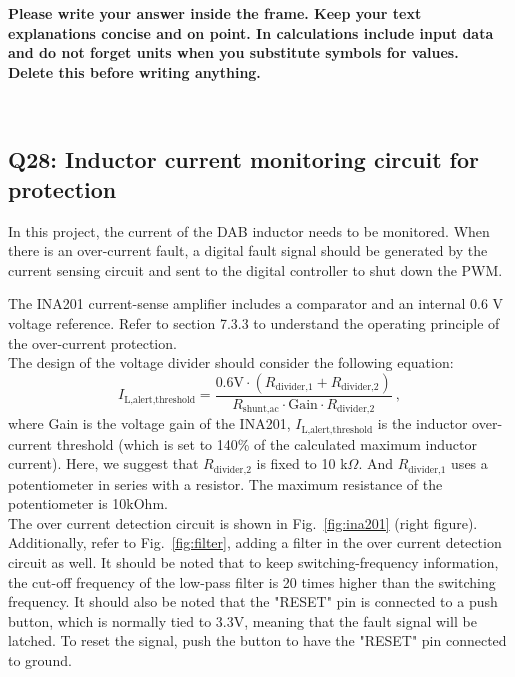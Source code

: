 \documentclass{PELsmallreport}
\begin{document}
\begin{framed}
	\vspace{2em}
	\textbf{Please write your answer inside the frame. Keep your text explanations concise and on point. In calculations include input data and do not forget units when you substitute symbols for values. \\ Delete this before writing anything.}
	\vspace{2em}
\end{framed}
 \quad {} \quad {} \quad \\
 \quad {} \quad {} \quad \hfill{}



\subsection{Q28: Inductor current monitoring circuit for protection}
In this project, the current of the DAB inductor needs to be monitored. When there is an over-current fault, a digital fault signal should be generated by the current sensing circuit and sent to the digital controller to shut down the PWM.

The INA201 current-sense amplifier includes a comparator and an internal 0.6 V voltage reference. Refer to section 7.3.3 to understand the operating principle of the over-current protection.\\

The design of the voltage divider should consider the following equation:
\begin{equation}
    I_\text{L,alert,threshold} = \frac{0.6\text{V} \cdot (R_\text{divider,1} + R_\text{divider,2})}{R_\text{shunt,ac}\cdot\text{Gain}\cdot R_\text{divider,2}}  \: , 
\end{equation}
where Gain is the voltage gain of the INA201, $I_\text{L,alert,threshold}$ is the inductor over-current threshold (which is set to 140\% of the calculated maximum inductor current). Here, we suggest that $R_\text{divider,2}$ is fixed to 10 k$\Omega$. And $R_\text{divider,1}$ uses a potentiometer in series with a resistor. The maximum resistance of the potentiometer is 10kOhm.\\

The over current detection circuit is shown in Fig.~\ref{fig:ina201} (right figure). Additionally, refer to Fig.~\ref{fig:filter}, adding a filter in the over current detection circuit as well. It should be noted that to keep switching-frequency information, the cut-off frequency of the low-pass filter is 20 times higher than the switching frequency. It should also be noted that the "RESET" pin is connected to a push button, which is normally tied to 3.3V, meaning that the fault signal will be latched. To reset the signal, push the button to have the "RESET" pin connected to ground.
\end{document}
